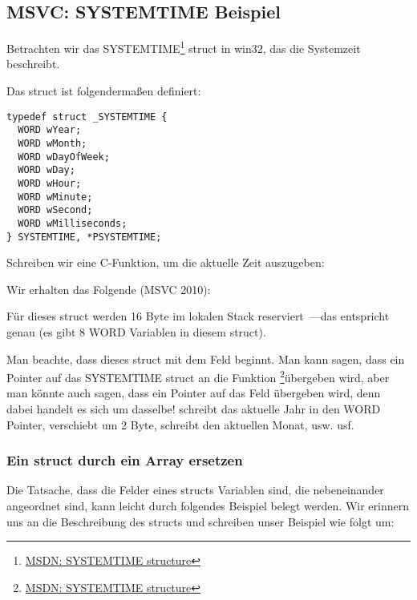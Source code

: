 \subsection{MSVC: SYSTEMTIME Beispiel}
\label{sec:SYSTEMTIME}

\newcommand{\FNSYSTEMTIME}{\footnote{\href{http://go.yurichev.com/17260}{MSDN: SYSTEMTIME structure}}}
Betrachten wir das SYSTEMTIME\FNSYSTEMTIME{} struct in win32, das die Systemzeit beschreibt.

Das struct ist folgendermaßen definiert:

\begin{lstlisting}[caption=WinBase.h,style=customc]
typedef struct _SYSTEMTIME {
  WORD wYear;
  WORD wMonth;
  WORD wDayOfWeek;
  WORD wDay;
  WORD wHour;
  WORD wMinute;
  WORD wSecond;
  WORD wMilliseconds;
} SYSTEMTIME, *PSYSTEMTIME;
\end{lstlisting}
Schreiben wir eine C-Funktion, um die aktuelle Zeit auszugeben:



Wir erhalten das Folgende (MSVC 2010):


Für dieses struct werden 16 Byte im lokalen Stack reserviert~---das entspricht genau  (es gibt 8
WORD Variablen in diesem struct).

\newcommand{\FNMSDNGST}{\footnote{\href{http://go.yurichev.com/17261}{MSDN: GetSystemTime function}}}
Man beachte, dass dieses struct mit dem  Feld beginnt.
Man kann sagen, dass ein Pointer auf das SYSTEMTIME struct an die Funktion \FNSYSTEMTIME übergeben
wird, aber man könnte auch sagen, dass ein Pointer auf das Feld  übergeben wird, denn dabei handelt es sich um
dasselbe!
 schreibt das aktuelle Jahr in den WORD Pointer, verschiebt um 2 Byte, schreibt den aktuellen Monat,
usw. usf. 



\subsubsection{Ein struct durch ein Array ersetzen}
Die Tatsache, dass die Felder eines structs Variablen sind, die nebeneinander angeordnet sind, kann leicht durch
folgendes Beispiel belegt werden. Wir erinnern uns an die Beschreibung des  structs und schreiben unser
Beispiel wie folgt um: 

